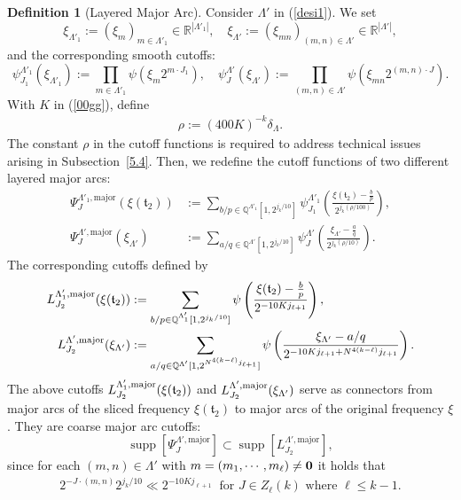 \documentclass[11 pt,letterpaper]{amsart}
\theoremstyle{plain}
\theoremstyle{definition}
\newtheorem{definition}{Definition}\numberwithin{definition}{section}
\theoremstyle{remark} \theoremstyle{exam} \theoremstyle{ob}
\numberwithin{equation}{section}
\begin{document}
 \begin{definition}[Layered Major Arc] 
Consider $\Lambda'$ in (\ref{desi1}). We set
\[
\xi_{\Lambda'_{1}} := (\xi_{m})_{m\in \Lambda'_{1}} \in \mathbb{R}^{|\Lambda'_{1}|}, \quad
\xi_{\Lambda'} := (\xi_{mn})_{(m,n) \in \Lambda'} \in \mathbb{R}^{|\Lambda'|},
\]
and the corresponding smooth cutoffs:
\[
\psi^{\Lambda'_{1}}_{J_1}(\xi_{\Lambda'_{1}}) := \prod_{m \in \Lambda'_{1}} \psi\left( \xi_{m}   2^{m\cdot J_1} \right), \quad
\psi^{\Lambda'}_{J}(\xi_{\Lambda'}) := \prod_{(m,n)\in \Lambda'} \psi\left( \xi_{mn}   2^{(m,n)\cdot J} \right).
\]
With  $K$ in (\ref{00gg}), define  \begin{align}\label{rho3}
	\rho:=(400K)^{-k}\delta_{\Lambda}.
\end{align}The constant $\rho$ in the cutoff functions is required to address technical issues arising in Subsection~\ref{5.4}. Then,
we redefine the cutoff functions of two different layered major arcs:
\begin{align}\label{4022k9}
\Psi^{\Lambda'_{1},\mathrm{major}}_{J}(\xi(\mathfrak{t}_2)) &:= \sum_{b/p \in \mathbb{Q}^{\Lambda'_{1}}[1, 2^{j_k/10}]}
\psi^{\Lambda'_{1}}_{J_1} \left( \frac{\xi(\mathfrak{t}_2) - \frac{b}{p}}{2^{j_k(\rho/100)}} \right), \nonumber \\
\Psi^{\Lambda',\mathrm{major}}_{J}(\xi_{\Lambda'}) &:= \sum_{a/q \in \mathbb{Q}^{\Lambda'}[1, 2^{j_k/10}]}
\psi^{\Lambda'}_{J} \left( \frac{\xi_{\Lambda'} - \frac{a}{q}}{2^{j_k(\rho/10)}} \right).
\end{align}
The corresponding  cutoffs defined by
\begin{align}
L_{J_2}^{\Lambda'_1,\rm{major}}(\xi(\mathfrak{t}_2))&:=\sum_{b/p\in \mathbb{Q}^{\Lambda'_1}[1,2^{j_k/10}]} \psi\left(\frac{\xi(\mathfrak{t}_{2}) -\frac{b}{p}}{ 2^{-10Kj_{\ell+1}} }\right),\label{88332}\\
L^{\Lambda',\rm{major}}_{J_2}(\xi_{\Lambda'})&:= \sum_{a/q\in \mathbb{Q}^{\Lambda'}[1,2^{N^{4(k-\ell)}j_{\ell+1}}]} \psi\left(\frac{\xi_{\Lambda'}-a/q}{2^{-10Kj_{\ell+1}+N^{4(k-\ell)}j_{\ell+1}  }}\right).\label{56}
\end{align}
The above cutoffs $L_{J_2}^{\Lambda'_1,\rm{major}}(\xi(\mathfrak{t}_2))$ and $L^{\Lambda',\rm{major}}_{J_2}(\xi_{\Lambda'})$ serve as connectors from major arcs of the sliced frequency $\xi(\mathfrak{t}_2)$ to major arcs of the original frequency $\xi$. 
They are  coarse major arc cutoffs:
\[
\operatorname{supp} \left[ \Psi^{\Lambda',\mathrm{major}}_{J} \right]
\subset \operatorname{supp} \left[L^{\Lambda',\mathrm{major}}_{J_2} \right],\]
since for each $  (m,n) \in \Lambda'  $ with $m=(m_1,\cdots,m_\ell)\ne {\bf 0}$   it holds that
\begin{align}\label{pik3}
2^{-J \cdot (m,n)}   2^{j_k/10} \ll 2^{-10 K j_{\ell+1}}\ \text{ for $J\in Z_\ell(k)$  where $\ell\le k-1$}.
\end{align}
 \end{definition}
\end{document}
